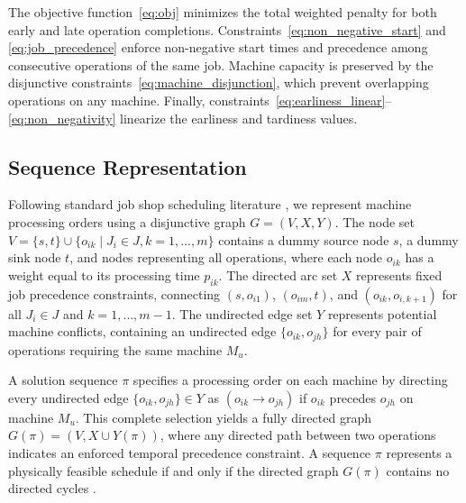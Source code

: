 The objective function~\eqref{eq:obj} minimizes the total weighted penalty for both early and late operation completions.
Constraints~\eqref{eq:non_negative_start} and \eqref{eq:job_precedence} enforce non-negative start times and precedence among consecutive operations of the same job.
Machine capacity is preserved by the disjunctive constraints~\eqref{eq:machine_disjunction}, which prevent overlapping operations on any machine. 
Finally, constraints~\eqref{eq:earliness_linear}--\eqref{eq:non_negativity} linearize the earliness and tardiness values.

\subsection{Sequence Representation}
\label{subsec:disjunctive_graph}

Following standard job shop scheduling literature \citep{pinedo2016}, we represent machine processing orders using a disjunctive graph $G = (V, X, Y)$.
The node set $V = \{s, t\} \cup \{o_{ik} \mid J_i \in J, k = 1, \ldots, m\}$ contains a dummy source node $s$, a dummy sink node $t$, and nodes representing all operations, where each node $o_{ik}$ has a weight equal to its processing time $p_{ik}$.
The directed arc set $X$ represents fixed job precedence constraints, connecting $(s, o_{i1})$, $(o_{im}, t)$, and $(o_{ik}, o_{i,k+1})$ for all $J_i \in J$ and $k = 1, \ldots, m-1$.
The undirected edge set $Y$ represents potential machine conflicts, containing an undirected edge $\{o_{ik}, o_{jh}\}$ for every pair of operations requiring the same machine $M_u$.

A solution sequence $\pi$ specifies a processing order on each machine by directing every undirected edge $\{o_{ik}, o_{jh}\} \in Y$ as $(o_{ik} \to o_{jh})$ if $o_{ik}$ precedes $o_{jh}$ on machine $M_u$.
This complete selection yields a fully directed graph $G(\pi) = (V, X \cup Y(\pi))$, where any directed path between two operations indicates an enforced temporal precedence constraint.
A sequence $\pi$ represents a physically feasible schedule if and only if the directed graph $G(\pi)$ contains no directed cycles \citep{pinedo2016}.


